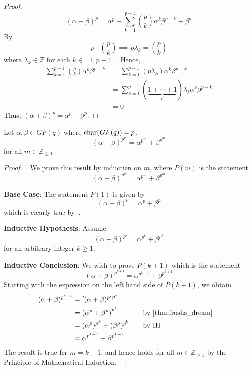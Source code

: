 \begin{proof}
    \[ (\alpha + \beta)^p=\alpha^p+\sum\limits_{k=1}^{p-1}
        \binom{p}{k}\alpha^k\beta^{p-k}+\beta^p \]
    By~,
    \[ p\mid \binom{p}{k}\implies p\lambda_k=\binom{p}{k} \]
    where $ \lambda_k\in\mathbb{Z} $ for each $ k\in[1,p-1] $. Hence,
    \begin{align*}
        \sum\limits_{k=1}^{p-1}\binom{p}{k}\alpha^k\beta^{p-k}
         & = \sum\limits_{k=1}^{p-1} (p\lambda_k) \alpha^k\beta^{p-k}                          \\
         & =\sum\limits_{k=1}^{p-1} (\underbrace{1+\cdots+1}_{p})\lambda_k \alpha^k\beta^{p-k} \\
         & =0
    \end{align*}
    Thus, $ (\alpha + \beta)^p=\alpha^p+\beta^p $.
\end{proof}

\begin{Corollary}{}{}
    Let $ \alpha,\beta\in GF(q) $ where $ \operatorname{char}(GF(q))=p $.
    \[ (\alpha+\beta)^{p^m}=\alpha^{p^m}+\beta^{p^m} \]
    for all $ m\in\mathbb{Z}_{\geqslant 1} $.
\end{Corollary}

\begin{proof} $ \dagger $
    We prove this result by induction on $ m $, where $ P(m) $ is the statement
    \[ (\alpha+\beta)^{p^m}=\alpha^{p^m}+\beta^{p^m} \]

    \textbf{Base Case}: The statement $ P(1) $ is given by
    \[ (\alpha+\beta)^{p}=\alpha^p+\beta^p \]
    which is clearly true by~.

    \textbf{Inductive Hypothesis}: Assume
    \[ (\alpha+\beta)^{p^k}=\alpha^{p^k}+\beta^{p^k} \]
    for an arbitrary integer $ k\geqslant 1 $.

    \textbf{Inductive Conclusion}: We wish to prove $ P(k+1) $
    which is the statement
    \[ (\alpha+\beta)^{p^{k+1}}=\alpha^{p^{k+1}}+\beta^{p^{k+1}} \]
    Starting with the expression on the left hand side of $ P(k+1) $,
    we obtain
    \[ \begin{aligned}
            (\alpha+\beta)^{p^{k+1}}
             & =\left[ (\alpha+\beta)^{p} \right]^{p^{k}}                                             \\
             & =\left( \alpha^p+\beta^p \right)^{p^k}     & \quad & \text{by~\Cref{thm:froshs_dream}} \\
             & = (\alpha^p)^{p^k}+(\beta^p)^{p^k}         &       & \text{by IH}                      \\
             & =\alpha^{p^{k+1}}+\beta^{p^{k+1}}
        \end{aligned}
    \]
    The result is true for $ m=k+1 $, and hence holds for all $ m\in\mathbb{Z}_{\geqslant 1} $
    by the Principle of Mathematical Induction.
\end{proof}

